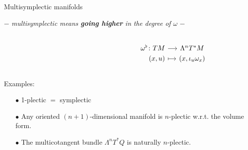 \documentclass[10pt]{beamer}
\begin{document}
\begin{frame}[t, fragile]{Multisymplectic manifolds} %
	\begin{center}
		$-$ \emph{multisymplectic means \textbf{going higher} in the degree of $\omega$} $-$
	\end{center}
	\pause
	\begin{defblock}
			
	\end{defblock}
	\pause
	\begin{defblock}
		\begin{columns}
			\begin{column}{.45\linewidth}
			\end{column}
			\begin{column}{.5\linewidth}
						\vspace{-.5em}
				\[
				\begin{tikzcd}[column sep= small,row sep=0ex,
				/tikz/column 1/.append style={anchor=base east}]
				    \omega^\flat \colon T M \ar[r]& \Lambda^n T^\ast M \\
  						 (x,u) \ar[r, mapsto]& (x,\iota_{u} \omega_x)						
				\end{tikzcd}	
				\]
			\end{column}
		\end{columns}
	\end{defblock}		
	\vfill
	\pause
	\begin{block}{Examples:}
		\begin{itemize}
			\item[$\bullet$] 1-plectic $=$ symplectic
			\item[$\bullet$] Any oriented $(n+1)$-dimensional manifold is $n$-plectic w.r.t. the volume form.
			\item[$\bullet$] The multicotangent bundle $\Lambda^n T^\ast Q$ is naturally $n$-plectic.
		\end{itemize}
	\end{block}			 
%

\end{frame}
\end{document}

